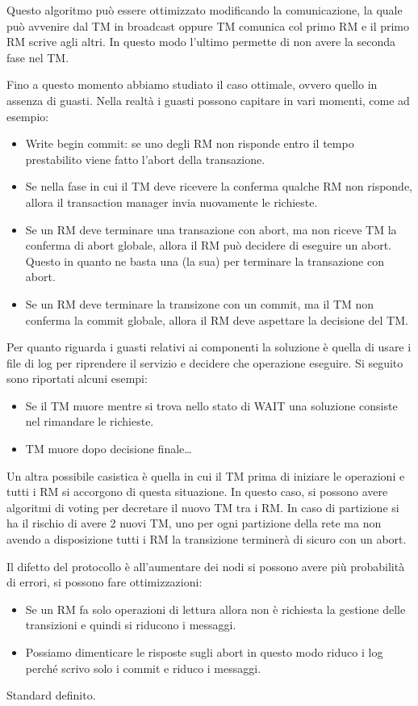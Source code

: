 Questo algoritmo può essere ottimizzato modificando la comunicazione, la quale
può avvenire dal TM in broadcast oppure TM comunica col primo RM e il primo RM
scrive agli altri. In questo modo l'ultimo permette di non avere la seconda fase
nel TM.

Fino a questo momento abbiamo studiato il caso ottimale, ovvero quello in assenza
di guasti. Nella realtà i guasti possono capitare in vari momenti, come ad esempio:
\begin{itemize}
      \item Write begin commit: se uno degli RM non risponde entro il tempo
            prestabilito viene fatto l'abort della transazione.
      \item Se nella fase in cui il TM deve ricevere la conferma qualche RM non
            risponde, allora il transaction manager invia nuovamente le richieste.
      \item Se un RM deve terminare una transazione con abort, ma non riceve TM
            la conferma di abort globale, allora il RM può decidere di eseguire
            un abort. Questo in quanto ne basta una (la sua) per terminare la
            transazione con abort.
      \item Se un RM deve terminare la transizone con un commit, ma il TM non
            conferma la commit globale, allora il RM deve aspettare la decisione
            del TM.
\end{itemize}
Per quanto riguarda i guasti relativi ai componenti la soluzione è quella di
usare i file di log per riprendere il servizio e decidere che operazione eseguire.
Si seguito sono riportati alcuni esempi:
\begin{itemize}
      \item Se il TM muore mentre si trova nello stato di WAIT una soluzione
            consiste nel rimandare le richieste.
      \item TM muore dopo decisione finale\dots
\end{itemize}

Un altra possibile casistica è quella in cui il TM prima di iniziare le operazioni
e tutti i RM si accorgono di questa situazione. In questo caso, si possono avere
algoritmi di voting per decretare il nuovo TM tra i RM. In caso di partizione si
ha il rischio di avere 2 nuovi TM, uno per ogni partizione della rete ma non
avendo a disposizione tutti i RM la transizione terminerà di sicuro con un abort.

Il difetto del protocollo è all'aumentare dei nodi si possono avere più probabilità
di errori, si possono fare ottimizzazioni:
\begin{itemize}
      \item Se un RM fa solo operazioni di lettura allora non è richiesta la
            gestione delle transizioni e quindi si riducono i messaggi.
      \item Possiamo dimenticare le risposte sugli abort in questo modo riduco
            i log perché scrivo solo i commit e riduco i messaggi.
\end{itemize}

Standard definito.